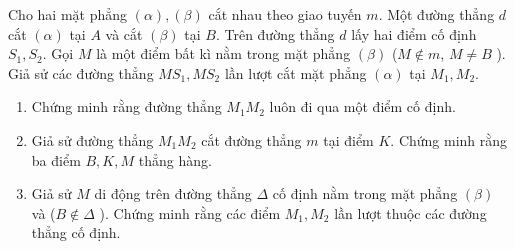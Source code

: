 \begin{bt}%

	Cho hai mặt phẳng $(\alpha),(\beta)$ cắt nhau theo giao tuyến $m$. Một đường thẳng $d$ cắt $(\alpha)$ tại $A$ và cắt $(\beta)$ tại $B$. Trên đường thẳng $d$ lấy hai điểm cố định $S_1,S_2$. Gọi $M$ là một điểm bất kì nằm trong mặt phẳng $(\beta)$ ($M \notin m$, $M \ne B$ ). Giả sử các đường thẳng $MS_1,MS_2$ lần lượt cắt mặt phẳng $(\alpha)$ tại $M_1,M_2$.
	\begin{enumerate}
		\item Chứng minh rằng đường thẳng $M_1M_2$ luôn đi qua một điểm cố định.
		\item Giả sử đường thẳng $M_1M_2$ cắt đường thẳng $m$ tại điểm $K$. Chứng minh rằng ba điểm $B,K,M$ thẳng hàng.
		\item Giả sử $M$ di động trên đường thẳng $\Delta$ cố định nằm trong mặt phẳng $(\beta)$ và ($B \notin \Delta$ ). Chứng minh rằng các điểm $M_1,M_2$ lần lượt thuộc các đường thẳng cố định.
	\end{enumerate}
\end{bt}
